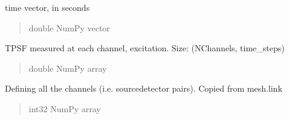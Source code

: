 \documentclass[letterpaper,10pt,english]{sphinxmanual}
\begin{document}
\begin{fulllineitems}
\begin{fulllineitems}
\begin{quote}
\begin{description}
\end{description}\end{quote}

\end{fulllineitems}


\begin{fulllineitems}
\label{\detokenize{_autosummary/nirfasterff.base.data.flTPSFdata:nirfasterff.base.data.flTPSFdata.time}}
\pysigstartsignatures
{}
\pysigstopsignatures
\sphinxAtStartPar
time vector, in seconds
\begin{quote}\begin{description}
\sphinxAtStartPar
double NumPy vector

\end{description}\end{quote}

\end{fulllineitems}


\begin{fulllineitems}
\label{\detokenize{_autosummary/nirfasterff.base.data.flTPSFdata:nirfasterff.base.data.flTPSFdata.tpsfx}}
\pysigstartsignatures
{}
\pysigstopsignatures
\sphinxAtStartPar
TPSF measured at each channel, excitation. Size: (NChannels, time\_steps)
\begin{quote}\begin{description}
\sphinxAtStartPar
double NumPy array

\end{description}\end{quote}

\end{fulllineitems}


\begin{fulllineitems}
\label{\detokenize{_autosummary/nirfasterff.base.data.flTPSFdata:nirfasterff.base.data.flTPSFdata.link}}
\pysigstartsignatures
{}
\pysigstopsignatures
\sphinxAtStartPar
Defining all the channels (i.e. source\sphinxhyphen{}detector pairs). Copied from mesh.link
\begin{quote}\begin{description}
\sphinxAtStartPar
int32 NumPy array


\end{description}
\end{quote}
\end{fulllineitems}
\end{fulllineitems}
\end{document}
